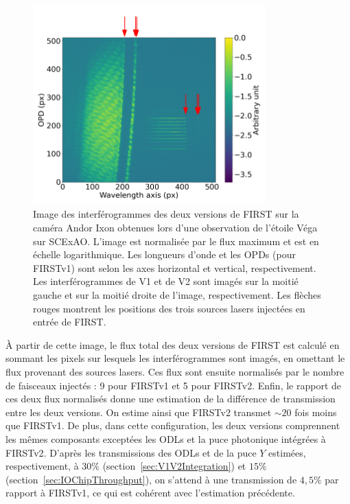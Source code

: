 \begin{figure}[ht!]
    \centering
    \includegraphics[width=0.8\textwidth]{Figure_Chap5/20220224_Vega_V1V2_FullOn_010_Image100_logscale_arrow.png}
    \caption[Image des interférogrammes des deux versions de FIRST sur la caméra Andor Ixon obtenues lors d'une observation de l'étoile Véga sur SCExAO.]{Image des interférogrammes des deux versions de FIRST sur la caméra Andor Ixon obtenues lors d'une observation de l'étoile Véga sur SCExAO. L'image est normalisée par le flux maximum et est en échelle logarithmique. Les longueurs d'onde et les OPDs (pour FIRSTv1) sont selon les axes horizontal et vertical, respectivement. Les interférogrammes de V1 et de V2 sont imagés sur la moitié gauche et sur la moitié droite de l'image, respectivement. Les flèches rouges montrent les positions des trois sources lasers injectées en entrée de FIRST.}
    \label{fig:V1V2Vega}
\end{figure}

À partir de cette image, le flux total des deux versions de \ac{FIRST} est calculé en sommant les pixels sur lesquels les interférogrammes sont imagés, en omettant le flux provenant des sources lasers. Ces flux sont ensuite normalisés par le nombre de faisceaux injectés : 9 pour \ac{FIRSTv1} et 5 pour \ac{FIRSTv2}. Enfin, le rapport de ces deux flux normalisés donne une estimation de la différence de transmission entre les deux versions. On estime ainsi que \ac{FIRSTv2} transmet $\sim 20$ fois moins que \ac{FIRSTv1}. De plus, dans cette configuration, les deux versions comprennent les mêmes composants exceptées les \ac{ODL}s et la puce photonique intégrées à \ac{FIRSTv2}. D'après les transmissions des \ac{ODL}s et de la puce $Y$ estimées, respectivement, à $30\%$ (section~\ref{sec:V1V2Integration}) et $15 \%$ (section~\ref{sec:IOChipThroughput}), on s'attend à une transmission de $4,5\%$ par rapport à \ac{FIRSTv1}, ce qui est cohérent avec l'estimation précédente.

